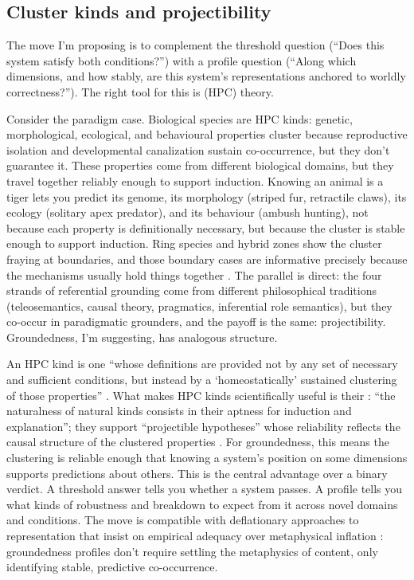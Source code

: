 \documentclass[12pt]{article}
\begin{document}
\subsection{Cluster kinds and projectibility}
\label{sec:cluster-mechanisms}

The move I'm proposing is to complement the threshold question (\enquote{Does this system satisfy both conditions?}) with a profile question (\enquote{Along which dimensions, and how stably, are this system's representations anchored to worldly correctness?}). The right tool for this is  (HPC) theory.

Consider the paradigm case. Biological species are HPC kinds: genetic, morphological, ecological, and behavioural properties cluster because reproductive isolation and developmental canalization sustain co-occurrence, but they don't guarantee it. These properties come from different biological domains, but they travel together reliably enough to support induction. Knowing an animal is a tiger lets you predict its genome, its morphology (striped fur, retractile claws), its ecology (solitary apex predator), and its behaviour (ambush hunting), not because each property is definitionally necessary, but because the cluster is stable enough to support induction. Ring species and hybrid zones show the cluster fraying at boundaries, and those boundary cases are informative precisely because the mechanisms usually hold things together \citep{boyd_1999_homeostasis}. The parallel is direct: the four strands of referential grounding come from different philosophical traditions (teleosemantics, causal theory, pragmatics, inferential role semantics), but they co-occur in paradigmatic grounders, and the payoff is the same: projectibility. Groundedness, I'm suggesting, has analogous structure.

An HPC kind is one \enquote{whose definitions are provided not by any set of necessary and sufficient conditions, but instead by a \enquote*{homeostatically} sustained clustering of those properties} \citep[141]{boyd_1999_homeostasis}. What makes HPC kinds scientifically useful is their : \enquote{the naturalness of natural kinds consists in their aptness for induction and explanation}; they support \enquote{projectible hypotheses} whose reliability reflects the causal structure of the clustered properties \citep[147]{boyd_1999_homeostasis}. For groundedness, this means the clustering is reliable enough that knowing a system's position on some dimensions supports predictions about others. This is the central advantage over a binary verdict. A threshold answer tells you whether a system passes. A profile tells you what kinds of robustness and breakdown to expect from it across novel domains and conditions. The move is compatible with deflationary approaches to representation that insist on empirical adequacy over metaphysical inflation \citep{coelho_mollo_2022_deflationary_realism}: groundedness profiles don't require settling the metaphysics of content, only identifying stable, predictive co-occurrence.
\end{document}
